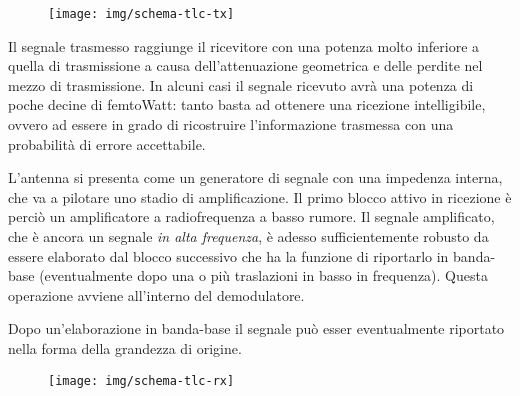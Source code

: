 \begin{figure}[hb]
	\centering
	\texttt{[image: img/schema-tlc-tx]}
	\caption{}
	\label{fig:schema-tlc-tx}
\end{figure}

Il segnale trasmesso raggiunge il ricevitore con una potenza molto inferiore a quella di trasmissione a causa dell'attenuazione geometrica e delle perdite nel mezzo di trasmissione. In alcuni casi il segnale ricevuto avrà una potenza di poche decine di femtoWatt: tanto basta ad ottenere una ricezione intelligibile, ovvero ad essere in grado di ricostruire l'informazione trasmessa con una probabilità di errore accettabile.

L'antenna si presenta come un generatore di segnale con una impedenza interna, che va a pilotare uno stadio di amplificazione.
Il primo blocco attivo in ricezione è perciò un amplificatore a radiofrequenza a basso rumore.
Il segnale amplificato, che è ancora un segnale \textit{in alta frequenza}, è adesso sufficientemente robusto da essere elaborato dal blocco successivo che ha la funzione di riportarlo in banda-base (eventualmente dopo una o più traslazioni in basso in frequenza). Questa operazione avviene
all'interno del demodulatore.

Dopo un'elaborazione in banda-base il segnale può esser eventualmente riportato nella forma della
grandezza di origine.

\begin{figure}[hb]
	\centering
	\texttt{[image: img/schema-tlc-rx]}
	\caption{}
	\label{fig:schema-tlc-rx}
\end{figure}